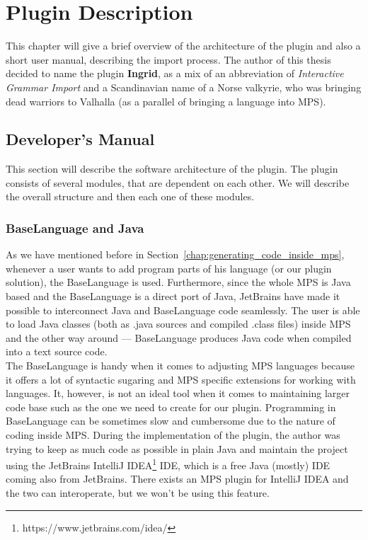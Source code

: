 \chapter{Plugin Description}

This chapter will give a brief overview of the architecture of the plugin and also a short user manual, describing the import process.
The author of this thesis decided to name the plugin \textbf{Ingrid}, as a mix of an abbreviation of \textit{Interactive Grammar Import} and a Scandinavian name of a Norse valkyrie, who was bringing dead warriors to Valhalla (as a parallel of bringing a language into MPS).

\section{Developer's Manual}

This section will describe the software architecture of the plugin.
The plugin consists of several modules, that are dependent on each other.
We will describe the overall structure and then each one of these modules.

\subsection{BaseLanguage and Java}

As we have mentioned before in Section~\ref{chap:generating_code_inside_mps}, whenever a user wants to add program parts of his language (or our plugin solution), the BaseLanguage is used.
Furthermore, since the whole MPS is Java based and the BaseLanguage is a direct port of Java, JetBrains have made it possible to interconnect Java and BaseLanguage code seamlessly.
The user is able to load Java classes (both as .java sources and compiled .class files) inside MPS and the other way around --- BaseLanguage produces Java code when compiled into a text source code.
\\

The BaseLanguage is handy when it comes to adjusting MPS languages because it offers a lot of syntactic sugaring and MPS specific extensions for working with languages.
It, however, is not an ideal tool when it comes to maintaining larger code base such as the one we need to create for our plugin.
Programming in BaseLanguage can be sometimes slow and cumbersome due to the nature of coding inside MPS.
During the implementation of the plugin, the author was trying to keep as much code as possible in plain Java and maintain the project using the JetBrains IntelliJ IDEA\footnote{https://www.jetbrains.com/idea/} IDE, which is a free Java (mostly) IDE coming also from JetBrains.
There exists an MPS plugin for IntelliJ IDEA and the two can interoperate, but we won't be using this feature.
\\

